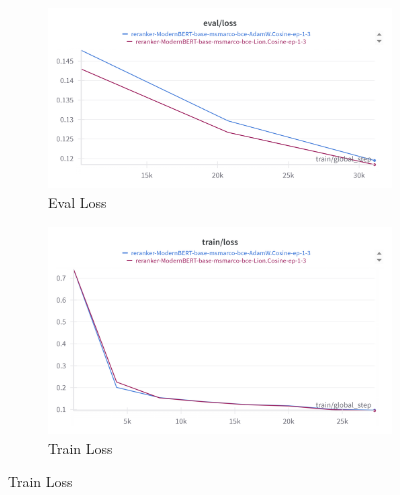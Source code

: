 \documentclass[conference]{IEEEtran}
\begin{document}
\begin{figure}[htbp]
\centering

\begin{subfigure}[b]{0.45\textwidth}
    \includegraphics[width=\linewidth]{figures/modernBERT-Lion-AdamW-eval_loss.png}
    \caption{Eval Loss}
    \label{fig:modernbert_eval_loss}
\end{subfigure}
\hfill
\begin{subfigure}[b]{0.45\textwidth}
    \includegraphics[width=\linewidth]{figures/modernBERT-Lion-adamW-train_loss.png}
    \caption{Train Loss}
    \label{fig:modernbert_train_loss}
\end{subfigure}

\vspace{0.5cm}


\end{figure}
\end{document}

